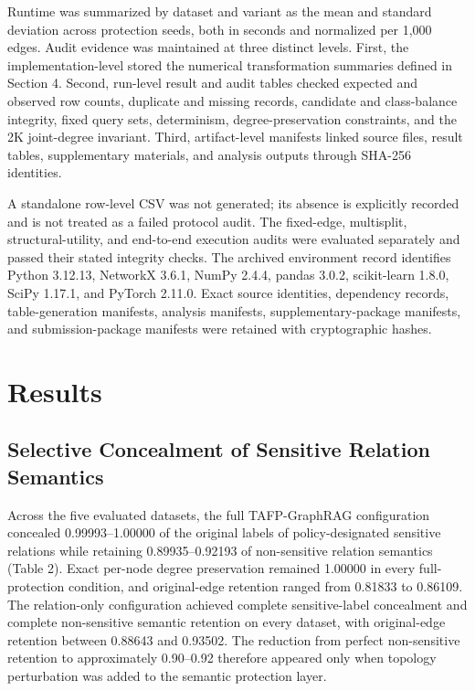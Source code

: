 \documentclass[preprint,12pt]{elsarticle}
\begin{document}
Runtime was summarized by dataset and variant as the mean and standard deviation across protection seeds, both in seconds and normalized per 1,000 edges. Audit evidence was maintained at three distinct levels. First, the implementation-level  stored the numerical transformation summaries defined in Section 4. Second, run-level result and audit tables checked expected and observed row counts, duplicate and missing records, candidate and class-balance integrity, fixed query sets, determinism, degree-preservation constraints, and the 2K joint-degree invariant. Third, artifact-level manifests linked source files, result tables, supplementary materials, and analysis outputs through SHA-256 identities.

A standalone row-level  CSV was not generated; its absence is explicitly recorded and is not treated as a failed protocol audit. The fixed-edge, multisplit, structural-utility, and end-to-end execution audits were evaluated separately and passed their stated integrity checks. The archived environment record identifies Python 3.12.13, NetworkX 3.6.1, NumPy 2.4.4, pandas 3.0.2, scikit-learn 1.8.0, SciPy 1.17.1, and PyTorch 2.11.0. Exact source identities, dependency records, table-generation manifests, analysis manifests, supplementary-package manifests, and submission-package manifests were retained with cryptographic hashes.

\section{Results}
\subsection{Selective Concealment of Sensitive Relation Semantics}
Across the five evaluated datasets, the full TAFP-GraphRAG configuration concealed 0.99993--1.00000 of the original labels of policy-designated sensitive relations while retaining 0.89935--0.92193 of non-sensitive relation semantics (Table 2). Exact per-node degree preservation remained 1.00000 in every full-protection condition, and original-edge retention ranged from 0.81833 to 0.86109. The relation-only configuration achieved complete sensitive-label concealment and complete non-sensitive semantic retention on every dataset, with original-edge retention between 0.88643 and 0.93502. The reduction from perfect non-sensitive retention to approximately 0.90--0.92 therefore appeared only when topology perturbation was added to the semantic protection layer.
\end{document}
